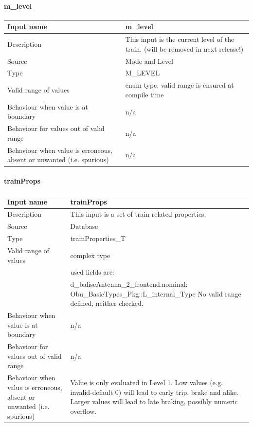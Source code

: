 \paragraph{m\_level}

\begin{longtable}{p{}p{}}
\toprule
Input name				& m\_level \\
\midrule
Description				& This input is the current level of the train. (will be removed in next release!)\\
\midrule
Source					& Mode and Level \\ 
\midrule
Type					& M\_LEVEL \\
\midrule
Valid range of values	& enum type, valid range is ensured at compile time \\
\midrule
Behaviour when value is at boundary	& n/a \\
\midrule
Behaviour for values out of valid range	& n/a \\
\midrule
Behaviour when value is erroneous, absent or unwanted (i.e. spurious) & n/a \\
\bottomrule
\end{longtable}


\paragraph{trainProps}

\begin{longtable}{p{}p{}}
\toprule
Input name				& trainProps \\
\midrule
Description				& This input is a set of train related properties. \\
\midrule
Source					& Database \\ 
\midrule
Type					& trainProperties\_T \\
\midrule
Valid range of values	& complex type \\
 & used fields are: \\
 & d_baliseAntenna_2_frontend.nominal: Obu\_BasicTypes\_Pkg::L\_internal\_Type No valid range defined, neither checked. \\
\midrule
Behaviour when value is at boundary	& n/a \\
\midrule
Behaviour for values out of valid range	& n/a \\
\midrule
Behaviour when value is erroneous, absent or unwanted (i.e. spurious) & Value is only evaluated in Level 1. Low values (e.g. invalid-default 0) will lead to early trip, brake and alike. Larger values will lead to late braking, possibly numeric overflow. \\
\bottomrule
\end{longtable}


